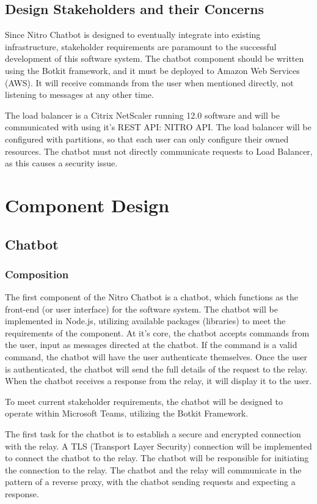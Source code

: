 \documentclass[onecolumn, draftclsnofoot,10pt, compsoc]{IEEEtran}
\begin{document}
\subsection{Design Stakeholders and their Concerns}
Since Nitro Chatbot is designed to eventually integrate into existing infrastructure, stakeholder requirements are paramount to the successful development of this software system.
The chatbot component should be written using the Botkit framework, and it must be deployed to Amazon Web Services (AWS). 
It will receive commands from the user when mentioned directly, not listening to messages at any other time.

The load balancer is a Citrix NetScaler running 12.0 software and will be communicated with using it's REST API: NITRO API.
The load balancer will be configured with partitions, so that each user can only configure their owned resources.
The chatbot must not directly communicate requests to Load Balancer, as this causes a security issue.

\section{Component Design}
\subsection{Chatbot}
\subsubsection{Composition}
The first component of the Nitro Chatbot is a chatbot, which functions as the front-end (or user interface) for the software system.
The chatbot will be implemented in Node.js, utilizing available packages (libraries) to meet the requirements of the component.
At it’s core, the chatbot accepts commands from the user, input as messages directed at the chatbot.
If the command is a valid command, the chatbot will have the user authenticate themselves.
Once the user is authenticated, the chatbot will send the full details of the request to the relay.
When the chatbot receives a response from the relay, it will display it to the user.

To meet current stakeholder requirements, the chatbot will be designed to operate within Microsoft Teams, utilizing the Botkit Framework\cite{botkit}.

The first task for the chatbot is to establish a secure and encrypted connection with the relay.
A TLS (Transport Layer Security) connection will be implemented to connect the chatbot to the relay.
The chatbot will be responsible for initiating the connection to the relay.
The chatbot and the relay will communicate in the pattern of a reverse proxy, with the chatbot sending requests and expecting a response.
\end{document}
